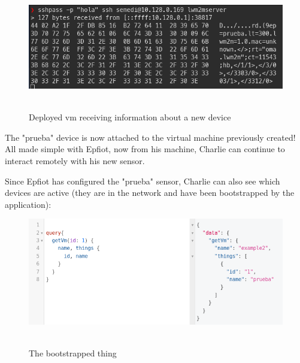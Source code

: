 \begin{figure}[h!]%
\centering
    \includegraphics[width=6.5in]{figures/bs_endpoint_log3.png}
~\caption{Deployed vm receiving information about a new device}
\label{figure6.16}
\end{figure}

The "prueba" device is now attached to the virtual machine previously created! All made simple with Epfiot, now from his machine, Charlie can continue to interact remotely with his new sensor.

Since Epfiot has configured the "prueba" sensor, Charlie can also see which devices are active (they are in the network and have been bootstrapped by the application):


\begin{figure}[h!]%
\centering
    \includegraphics[width=6.5in]{figures/attached_thing.png}
~\caption{The bootstrapped thing}
\label{figure6.17}
\end{figure}
